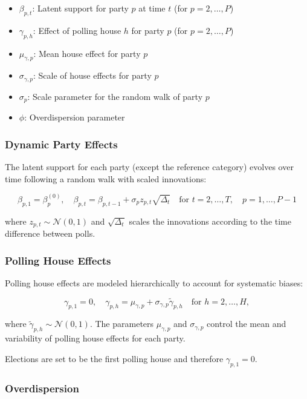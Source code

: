 \documentclass[
  letterpaper,
  DIV=11,
  numbers=noendperiod]{scrartcl}
\providecommand{\tightlist}{%
  \setlength{\itemsep}{0pt}\setlength{\parskip}{0pt}}\usepackage{longtable,booktabs,array}
\begin{document}
\begin{itemize}
\tightlist
\item
  \(\beta_{p,t}\): Latent support for party \(p\) at time \(t\) (for
  \(p = 2,\ldots,P\))
\item
  \(\gamma_{p,h}\): Effect of polling house \(h\) for party \(p\) (for
  \(p = 2,\ldots,P\))
\item
  \(\mu_{\gamma,p}\): Mean house effect for party \(p\)
\item
  \(\sigma_{\gamma,p}\): Scale of house effects for party \(p\)
\item
  \(\sigma_p\): Scale parameter for the random walk of party \(p\)
\item
  \(\phi\): Overdispersion parameter
\end{itemize}

\subsubsection{Dynamic Party Effects}\label{dynamic-party-effects}

The latent support for each party (except the reference category)
evolves over time following a random walk with scaled innovations:

\[
\beta_{p,1} = \beta_{p}^{(0)}, \quad \beta_{p,t} = \beta_{p,t-1} + \sigma_p z_{p,t} \sqrt{\Delta_t} \quad \text{for } t = 2, \dots, T, \quad p=1, \dots, P - 1
\]

where \(z_{p,t} \sim \mathcal{N}(0, 1)\) and \(\sqrt{\Delta_t}\) scales
the innovations according to the time difference between polls.

\subsubsection{Polling House Effects}\label{polling-house-effects}

Polling house effects are modeled hierarchically to account for
systematic biases:

\[
\gamma_{p,1} = 0, \quad \gamma_{p,h} = \mu_{\gamma,p} + \sigma_{\gamma,p} \tilde{\gamma}_{p,h} \quad \text{for } h = 2, \dots, H,
\]

where \(\tilde{\gamma}_{p,h} \sim \mathcal{N}(0, 1)\). The parameters
\(\mu_{\gamma,p}\) and \(\sigma_{\gamma,p}\) control the mean and
variability of polling house effects for each party.

Elections are set to be the first polling house and therefore
\(\gamma_{p,1} = 0\).

\subsubsection{Overdispersion}\label{overdispersion}
\end{document}
